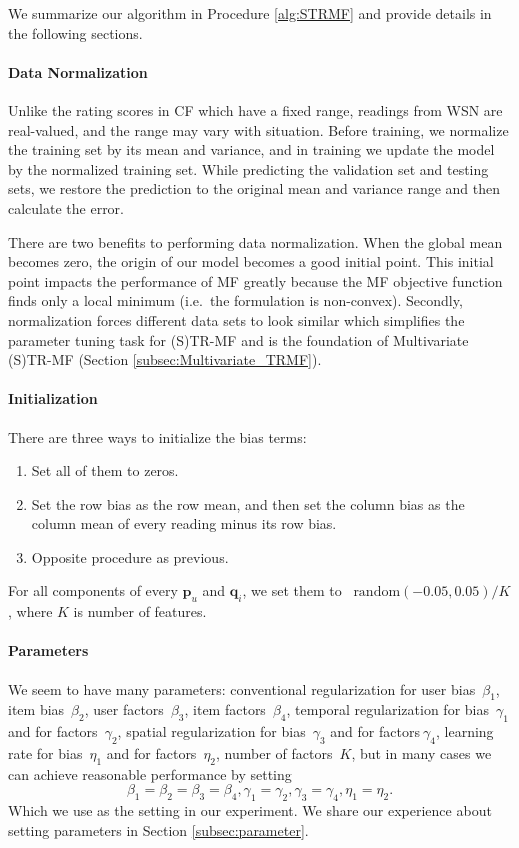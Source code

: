 We summarize our algorithm in Procedure \ref{alg:STRMF} and provide details in the following sections.

\paragraph*{Data Normalization}

Unlike the rating scores in CF which have a fixed range, readings from WSN are real-valued, and the range may vary with situation.
Before training, we normalize the training set by its mean and variance, and in training we update the model by the normalized training set.
While predicting the validation set and testing sets, we restore the prediction to the original mean and variance range and then calculate the error.

There are two benefits to performing data normalization.
When the global mean becomes zero, the origin of our model becomes a good initial point.
This initial point impacts the performance of MF greatly because the MF objective function finds only a local minimum (i.e.\ the formulation is non-convex).
Secondly, normalization forces different data sets to look similar which simplifies the parameter tuning task for (S)TR-MF and is the foundation of Multivariate (S)TR-MF (Section \ref{subsec:Multivariate_TRMF}). 


\paragraph*{Initialization}

There are three ways to initialize the bias terms:
\begin{enumerate}
	\setlength {\itemsep}{-5pt}
	\item Set all of them to zeros.
	\item Set the row bias as the row mean, and then set the column bias as the column mean of every reading minus its row bias.
	\item Opposite procedure as previous.
\end{enumerate}
For all components of every $\mathbf{p}_{u}$ and $\mathbf{q}_{i}$, we set them to ~$\mbox{random}(-0.05,0.05)/K$, where $K$ is number of features.

\paragraph*{Parameters}

We seem to have many parameters: conventional regularization for user bias~$\beta_1$, item bias~$\beta_2$, user factors~$\beta_3$, item factors~$\beta_4$, temporal regularization for bias~$\gamma_1$ and for factors~$\gamma_2$, spatial regularization for bias~$\gamma_3$ and for factors$~\gamma_4$, learning rate for bias~$\eta_1$ and for factors~$\eta_2$, number of factors~$K$, but in many cases we can achieve reasonable performance by setting 
\begin{equation*}\beta_1 = \beta_2 = \beta_3 = \beta_4, \gamma_1 = \gamma_2, \gamma_3 = \gamma_4, \eta_1 = \eta_2. \end{equation*}
Which we use as the setting in our experiment.
We share our experience about setting parameters in Section \ref{subsec:parameter}.


